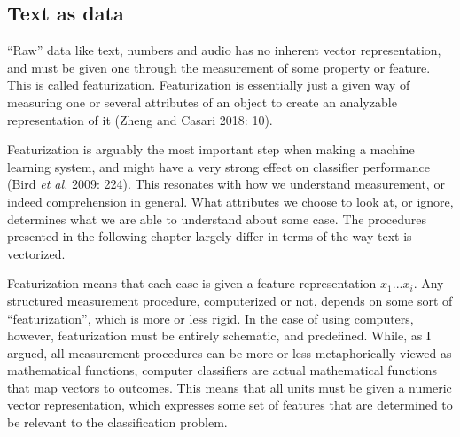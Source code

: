 \documentclass[12pt,twoside]{reedthesis}
\begin{document}
\subsection{Text as data}\label{text-as-data}

``Raw'' data like text, numbers and audio has no inherent vector
representation, and must be given one through the measurement of some
property or feature. This is called featurization. Featurization is
essentially just a given way of measuring one or several attributes of
an object to create an analyzable representation of it (Zheng and Casari
2018: 10).

Featurization is arguably the most important step when making a machine
learning system, and might have a very strong effect on classifier
performance (Bird \emph{et al.} 2009: 224). This resonates with how we
understand measurement, or indeed comprehension in general. What
attributes we choose to look at, or ignore, determines what we are able
to understand about some case. The procedures presented in the following
chapter largely differ in terms of the way text is vectorized.

Featurization means that each case is given a feature representation
\(x_1 ... x_i\). Any structured measurement procedure, computerized or
not, depends on some sort of ``featurization'', which is more or less
rigid. In the case of using computers, however, featurization must be
entirely schematic, and predefined. While, as I argued, all measurement
procedures can be more or less metaphorically viewed as mathematical
functions, computer classifiers are actual mathematical functions that
map vectors to outcomes. This means that all units must be given a
numeric vector representation, which expresses some set of features that
are determined to be relevant to the classification problem.
\end{document}
